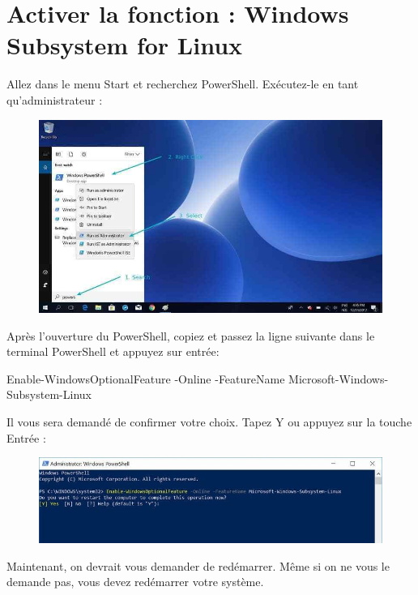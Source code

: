 \documentclass{article}
\begin{document}
\section{Activer la fonction : Windows Subsystem for Linux}
Allez dans le menu Start et recherchez PowerShell. Exécutez-le en tant qu'administrateur :
\begin{figure}[H]
\includegraphics[width=1\textwidth]{Plots/Powershell-Ubuntu-install.jpg}
\end{figure}
Après l'ouverture du PowerShell, copiez et passez la ligne suivante dans le terminal PowerShell et appuyez sur entrée:

\begin{tcolorbox}[width=\textwidth,colback={purple},title={PowerShell terminal},outer arc=0mm,colupper=white]    
    Enable-WindowsOptionalFeature -Online -FeatureName Microsoft-Windows-Subsystem-Linux
\end{tcolorbox}
Il vous sera demandé de confirmer votre choix. Tapez Y ou appuyez sur la touche Entrée :
\begin{figure}[H]
\includegraphics[width=1\textwidth]{Plots/Powershell-Ubuntu-install-2.jpg}
\end{figure}

Maintenant, on devrait vous demander de redémarrer. Même si on ne vous le demande pas, vous devez redémarrer votre système.
\end{document}
